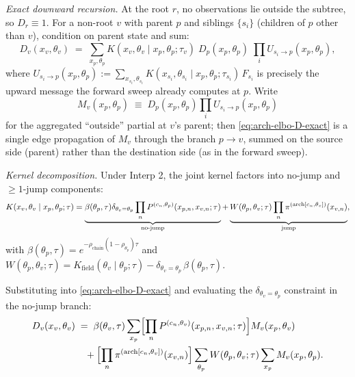\emph{Exact downward recursion.} At the root $r$, no observations lie
outside the subtree, so $D_r \equiv 1$. For a non-root $v$ with parent
$p$ and siblings $\{s_i\}$ (children of $p$ other than $v$),
condition on parent state and sum:
\begin{equation}
D_v(x_v, \theta_v) \;=\;
    \sum_{x_p, \theta_p}
        K(x_v, \theta_v \mid x_p, \theta_p; \tau_v) \;
        D_p(x_p, \theta_p) \;
        \prod_i U_{s_i \to p}(x_p, \theta_p),
    \label{eq:arch-elbo-D-exact}
\end{equation}
where $U_{s_i \to p}(x_p, \theta_p) := \sum_{x_{s_i}, \theta_{s_i}}
K(x_{s_i}, \theta_{s_i} \mid x_p, \theta_p; \tau_{s_i}) \, F_{s_i}$
is precisely the upward message the forward sweep already computes at
$p$. Write
\begin{equation}
M_v(x_p, \theta_p) \;\equiv\; D_p(x_p, \theta_p) \prod_i U_{s_i \to p}(x_p, \theta_p)
    \label{eq:arch-elbo-Mv}
\end{equation}
for the aggregated ``outside'' partial at $v$'s parent; then
\eqref{eq:arch-elbo-D-exact} is a single edge propagation of $M_v$
through the branch $p \to v$, summed on the source side (parent) rather
than the destination side (as in the forward sweep).

\emph{Kernel decomposition.} Under Interp 2, the joint kernel factors
into no-jump and $\geq\!1$-jump components:
\begin{equation}
K(x_v, \theta_v \mid x_p, \theta_p; \tau) =
    \underbrace{\beta(\theta_p, \tau) \delta_{\theta_v = \theta_p}
                    \prod_n P^{(c_n, \theta_p)}(x_{p, n}, x_{v, n}; \tau)}_{\text{no-jump}}
    + \underbrace{W(\theta_p, \theta_v; \tau) \prod_n \pi^{(\mathrm{arch}[c_n, \theta_v])}(x_{v, n})}_{\text{jump}},
    \label{eq:arch-elbo-K-decomp}
\end{equation}
with $\beta(\theta_p, \tau) = e^{-\rho_{\text{chain}}(1 - \rho_{\theta_p}) \tau}$
and $W(\theta_p, \theta_v; \tau) = K_{\mathrm{field}}(\theta_v \mid \theta_p; \tau)
- \delta_{\theta_v = \theta_p}\, \beta(\theta_p, \tau)$.

Substituting into \eqref{eq:arch-elbo-D-exact} and evaluating the
$\delta_{\theta_v = \theta_p}$ constraint in the no-jump branch:
\begin{align}
D_v(x_v, \theta_v)
    &\;=\;
    \beta(\theta_v, \tau)
        \sum_{x_p} \Bigl[\prod_n P^{(c_n, \theta_v)}(x_{p, n}, x_{v, n}; \tau)\Bigr]
        M_v(x_p, \theta_v)
    \nonumber \\
    &\quad
    + \Bigl[\prod_n \pi^{(\mathrm{arch}[c_n, \theta_v])}(x_{v, n})\Bigr]
        \sum_{\theta_p} W(\theta_p, \theta_v; \tau)
        \sum_{x_p} M_v(x_p, \theta_p).
    \label{eq:arch-elbo-D-two-terms}
\end{align}

